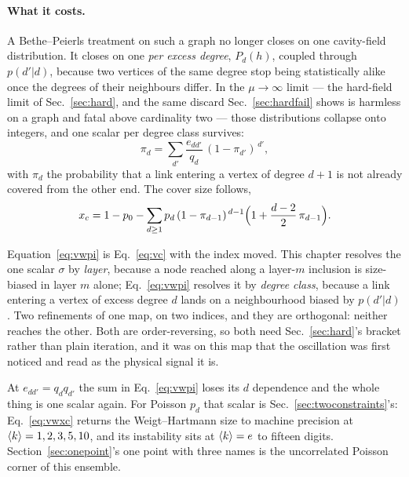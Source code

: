 \paragraph{What it costs.} A Bethe--Peierls treatment on such a graph no longer
closes on one cavity-field distribution. It closes on one \emph{per excess
degree}, $P_{d}(h)$, coupled through $p(d'|d)$, because two vertices of the same
degree stop being statistically alike once the degrees of their neighbours
differ. In the $\mu\to\infty$ limit --- the hard-field limit of
Sec.~\ref{sec:hard}, and the same discard Sec.~\ref{sec:hardfail} shows is
harmless on a graph and fatal above cardinality two --- those distributions
collapse onto integers, and one scalar per degree class survives:
\begin{equation}
  \pi_{d}=\sum_{d'}\frac{e_{dd'}}{q_{d}}\,(1-\pi_{d'})^{\,d'},
  \label{eq:vwpi}
\end{equation}
with $\pi_{d}$ the probability that a link entering a vertex of degree $d+1$ is
not already covered from the other end. The cover size follows,
\begin{equation}
  x_{c}=1-p_{0}-\sum_{d\ge1}p_{d}\,(1-\pi_{d-1})^{\,d-1}
        \Bigl(1+\frac{d-2}{2}\,\pi_{d-1}\Bigr).
  \label{eq:vwxc}
\end{equation}

Equation~\eqref{eq:vwpi} is Eq.~\eqref{eq:vc} with the index moved. This
chapter resolves the one scalar $\sigma$ by \emph{layer}, because a node reached
along a layer-$m$ inclusion is size-biased in layer $m$ alone;
Eq.~\eqref{eq:vwpi} resolves it by \emph{degree class}, because a link entering
a vertex of excess degree $d$ lands on a neighbourhood biased by $p(d'|d)$. Two
refinements of one map, on two indices, and they are orthogonal: neither
reaches the other. Both are order-reversing, so both need Sec.~\ref{sec:hard}'s
bracket rather than plain iteration, and it was on this map that the
oscillation was first noticed and read as the physical signal it is.

At $e_{dd'}=q_{d}q_{d'}$ the sum in Eq.~\eqref{eq:vwpi} loses its $d$
dependence and the whole thing is one scalar again. For Poisson $p_{d}$ that
scalar is Sec.~\ref{sec:twoconstraints}'s: Eq.~\eqref{eq:vwxc} returns the
Weigt--Hartmann size to machine precision at $\langle k \rangle=1,2,3,5,10$, and its
instability sits at $\langle k \rangle=e$ to fifteen digits. Section~\ref{sec:onepoint}'s
one point with three names is the uncorrelated Poisson corner of this ensemble.

